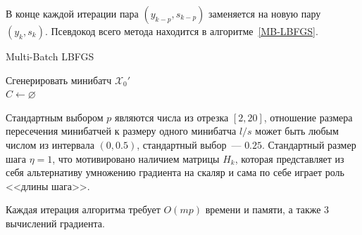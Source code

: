 \documentclass[preprint,12pt]{elsarticle}
\begin{document}
В конце каждой итерации пара $(y_{k - p}, s_{k - p})$ заменяется на новую пару $(y_k, s_k)$. 
Псевдокод всего метода находится в алгоритме~\ref{MB-LBFGS}.\\
\begin{algorithm}[H]\label{MB-LBFGS}
\caption {Multi-Batch LBFGS}
\SetAlgoLined
{}
 Сгенерировать минибатч $\mathcal{X}_0'$\\
 $C \leftarrow \varnothing$\\
\end{algorithm}
Стандартным выбором $p$ являются числа из отрезка $[2, 20]$, отношение размера пересечения минибатчей к размеру одного минибатча $l/s$ может быть любым числом из интервала $(0, 0.5)$, стандартный выбор~--- $0.25$. 
Стандартный размер шага $\eta = 1$, что мотивировано наличием матрицы $H_k$, которая представляет из себя альтернативу умножению градиента на скаляр и сама по себе играет роль <<длины шага>>.

Каждая итерация алгоритма требует $O(mp)$ времени и памяти, а также $3$ вычислений градиента.
\end{document}
